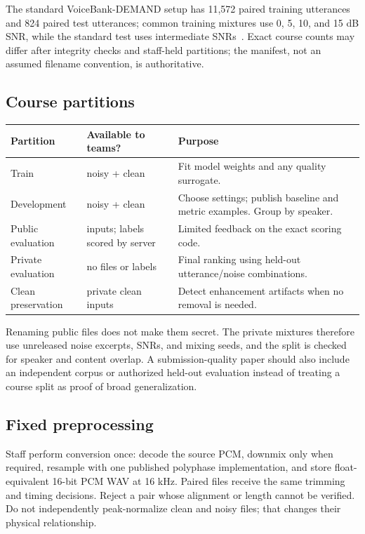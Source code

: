 \documentclass[11pt,letterpaper]{article}
\begin{document}
The standard VoiceBank-DEMAND setup has 11,572 paired training utterances and 824 paired test utterances; common training mixtures use 0, 5, 10, and 15 dB SNR, while the standard test uses intermediate SNRs~\cite{metricgan}. Exact course counts may differ after integrity checks and staff-held partitions; the manifest, not an assumed filename convention, is authoritative.

\subsection{Course partitions}
\begin{center}\small
\begin{tabularx}{\linewidth}{@{}p{1.1in}p{1.45in}Y@{}}
\toprule
Partition & Available to teams? & Purpose\\\midrule
Train & noisy + clean & Fit model weights and any quality surrogate.\\
Development & noisy + clean & Choose settings; publish baseline and metric examples. Group by speaker.\\
Public evaluation & inputs; labels scored by server & Limited feedback on the exact scoring code.\\
Private evaluation & no files or labels & Final ranking using held-out utterance/noise combinations.\\
Clean preservation & private clean inputs & Detect enhancement artifacts when no removal is needed.\\
\bottomrule
\end{tabularx}
\end{center}

Renaming public files does not make them secret. The private mixtures therefore use unreleased noise excerpts, SNRs, and mixing seeds, and the split is checked for speaker and content overlap. A submission-quality paper should also include an independent corpus or authorized held-out evaluation instead of treating a course split as proof of broad generalization.

\subsection{Fixed preprocessing}
Staff perform conversion once: decode the source PCM, downmix only when required, resample with one published polyphase implementation, and store float-equivalent 16-bit PCM WAV at 16 kHz. Paired files receive the same trimming and timing decisions. Reject a pair whose alignment or length cannot be verified. Do not independently peak-normalize clean and noisy files; that changes their physical relationship.
\end{document}
